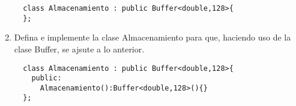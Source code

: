 \begin{enumerate}[label = \alph*)]
\begin{verbatim}
  class Almacenamiento : public Buffer<double,128>{
  };
\end{verbatim}

\item Defina e implemente la clase Almacenamiento para que, haciendo uso de la clase Buffer, se ajsute a lo anterior.
\begin{verbatim}
  class Almacenamiento : public Buffer<double,128>{
    public:
      Almacenamiento():Buffer<double,128>(){}
  };
\end{verbatim}
\end{enumerate}
